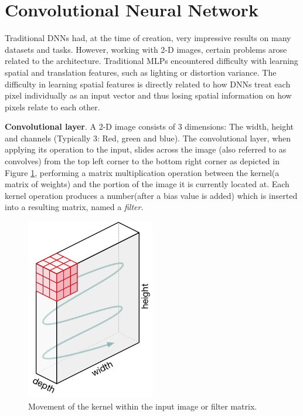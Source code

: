 \documentclass[english, bibtex]{kththesis}
\begin{document}
\section{Convolutional Neural Network}

Traditional DNNs had, at the time of creation, very impressive results on many datasets and tasks. However, working with 2-D images, certain problems arose related to the architecture. Traditional MLPs encountered difficulty with learning spatial and translation features, such as lighting or distortion variance. The difficulty in learning spatial features is directly related to how DNNs treat each pixel individually as an input vector and thus losing spatial information on how pixels relate to each other.

\textbf{Convolutional layer}. A 2-D image consists of 3 dimensions: The width, height and channels (Typically 3: Red, green and blue). The convolutional layer, when applying its operation to the input, slides across the image (also referred to as convolves) from the top left corner to the bottom right corner as depicted in Figure \ref{fig:kernelmovement}, performing a matrix multiplication operation between the kernel(a matrix of weights) and the portion of the image it is currently located at. Each kernel operation produces a number(after a bias value is added) which is inserted into a resulting matrix, named a \textit{filter}.

\begin{figure}[H]
  \begin{center}
    \includegraphics[width=0.5\textwidth]{figures/kernel_movement.png}
  \end{center}
  \caption{Movement of the kernel within the input image or filter matrix\cite{Kang2020DeepCN}.}
  \label{fig:kernelmovement}
\end{figure}
\end{document}
